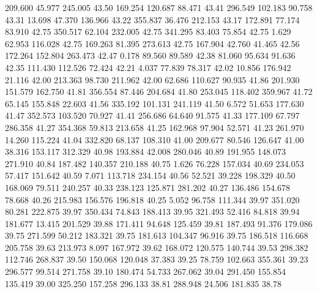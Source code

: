  209.600   45.977  245.005        43.50
 169.254  120.687   88.471        43.41
 296.549  102.183   90.758        43.31
  13.698   47.370  136.966        43.22
 355.837   36.476  212.153        43.17
 172.891   77.174   83.910        42.75
 350.517   62.104  232.005        42.75
 341.295   83.403   75.854        42.75
   1.629   62.953  116.028        42.75
 169.263   81.395  273.613        42.75
 167.904   42.760   41.465        42.56
 172.264  152.804  263.473        42.47
   0.178   89.560   89.589        42.38
  81.060   95.634   91.636        42.35
 111.430  112.526   72.424        42.21
   4.037   77.839   78.317        42.02
  10.856  176.942   21.116        42.00
 213.363   98.730  211.962        42.00
  62.686  110.627   90.935        41.86
 201.930  151.579  162.750        41.81
 356.554   87.446  204.684        41.80
 253.045  118.402  359.967        41.72
  65.145  155.848   22.603        41.56
 335.192  101.131  241.119        41.50
   6.572   51.653  177.630        41.47
 352.573  103.520   70.927        41.41
 256.686   64.640   91.575        41.33
 177.109   67.797  286.358        41.27
 354.368   59.813  213.658        41.25
 162.968   97.904   52.571        41.23
 261.970   14.260  115.224        41.04
 332.820   68.137  108.310        41.00
 209.677   80.546  126.647        41.00
  38.316  153.117  312.329        40.98
 193.884   42.008  280.046        40.89
 191.955  148.073  271.910        40.84
 187.482  140.357  210.188        40.75
   1.626   76.228  157.034        40.69
 234.053   57.417  151.642        40.59
   7.071  113.718  234.154        40.56
  52.521   39.228  198.329        40.50
 168.069   79.511  240.257        40.33
 238.123  125.871  281.202        40.27
 136.486  154.678   78.668        40.26
 215.983  156.576  196.818        40.25
   5.052   96.758  111.344        39.97
 351.020   80.281  222.875        39.97
 350.434   74.843  188.413        39.95
 321.493   52.416   84.818        39.94
 181.677   13.415  201.529        39.88
 171.411   94.648  125.459        39.81
 187.493   91.376  179.086        39.75
 271.599   50.212  183.321        39.75
 181.613  104.347   96.916        39.75
 186.518  116.668  205.758        39.63
 213.973    8.097  167.972        39.62
 168.072  120.575  140.744        39.53
 298.382  112.746  268.837        39.50
 150.068  120.048   37.383        39.25
  78.759  102.663  355.361        39.23
 296.577   99.514  271.758        39.10
 180.474   54.733  267.062        39.04
 291.450  155.854  135.419        39.00
 325.250  157.258  296.133        38.81
 288.948   24.506  181.835        38.78
